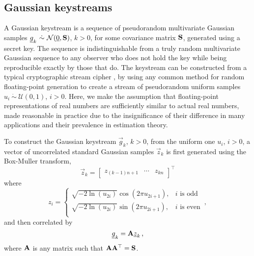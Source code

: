 \documentclass[conference]{IEEEtran}
\begin{document}
% 
% 

\subsection{Gaussian keystreams}\label{subsec:gauss_keystreams}
A Gaussian keystream is a sequence of pseudorandom multivariate Gaussian samples $\vec{g}_k\ \dot{\sim}\ \mathcal{N}(\vec{0},\mat{S})$, $k>0$, for some covariance matrix ${{\mathbf{S}}}$, generated using a secret key. The sequence is indistinguishable from a truly random multivariate Gaussian sequence to any observer who does not hold the key while being reproducible exactly by those that do. The keystream can be constructed from a typical cryptographic stream cipher \cite[Ch. 3.6]{katzIntroductionModernCryptography2008}, by using any common method for random floating-point generation \cite{goualardGeneratingRandomFloatingPoint2020} to create a stream of pseudorandom uniform samples $u_i\ \dot{\sim}\ \mathcal{U}(0,1)$, $i>0$. Here, we make the assumption that floating-point representations of real numbers are sufficiently similar to actual real numbers, made reasonable in practice due to the insignificance of their difference in many applications and their prevalence in estimation theory.

To construct the Gaussian keystream $\vec{g}_k$, $k>0$, from the uniform one $u_i$, $i>0$, a vector of uncorrelated standard Gaussian samples $\vec{z}_k$ is first generated using the Box-Muller transform,
\begin{equation}\label{eqn:standard_gaussian_generation}
    \vec{z}_k = 
  \begin{bmatrix}
    z_{(k-1)n+1} & \cdots & z_{kn}
  \end{bmatrix}^\top
\end{equation}
where 
\begin{equation*}
  z_i =
  \begin{cases}
    \sqrt{-2\ln(u_{2i})}\cos(2\pi u_{2i+1}), & i \text{ is odd}\\
    \sqrt{-2\ln(u_{2i})}\sin(2\pi u_{2i+1}), & i \text{ is even}\\
  \end{cases}\,,
\end{equation*}
and then correlated by
\begin{equation}\label{eqn:gaussian_keystream_generation}
    \vec{g}_k = \mat{A}\vec{z}_k\,,
\end{equation}
where ${{\mathbf{A}}}$ is any matrix such that ${{\mathbf{A}}}{{\mathbf{A}}}^\top = {{\mathbf{S}}}$.
\end{document}
